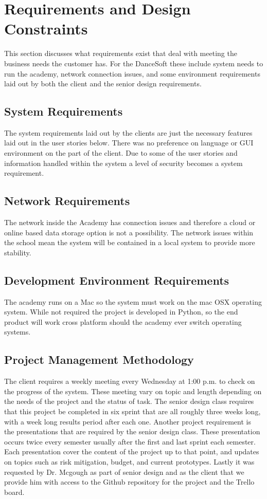 \section{Requirements and Design Constraints}
This section discusses what requirements exist that deal with meeting the business needs the customer has. For the DanceSoft these include system needs to run the academy, network connection issues, and some environment requirements laid out by both the client and the senior design requirements. 


\subsection{System  Requirements}
The system requirements laid out by the clients are just the necessary features laid out in the user stories below. There was no preference on language or GUI environment on the part of the client. Due to some of the user stories and information handled within the system a level of security becomes a system requirement. 


\subsection{Network Requirements}
The network inside the Academy has connection issues and therefore a cloud or online based data storage option is not a possibility. The network issues within the school mean the system will be contained in a local system to provide more stability.


\subsection{Development Environment Requirements}
The academy runs on a Mac so the system must work on the mac OSX operating system. While not required the project is developed in Python, so the end product will work cross platform should the academy ever switch operating systems.


\subsection{Project  Management Methodology}
The client requires a weekly meeting every Wednesday at 1:00 p.m. to check on the progress of the system. These meeting vary on topic and length depending on the needs of the project and the status of task. The senior design class requires that this project be completed in six sprint that are all roughly three weeks long, with a week long results period after each one. Another project requirement is the presentations that are required by the senior design class. These presentation occurs twice every semester usually after the first and last sprint each semester. Each presentation cover the content of the project up to that point, and updates on topics such as risk mitigation, budget, and current prototypes. Lastly it was requested by Dr. Mcgough as part of senior design and as the client that we provide him with access to the Github repository for the project and the Trello board.
 


